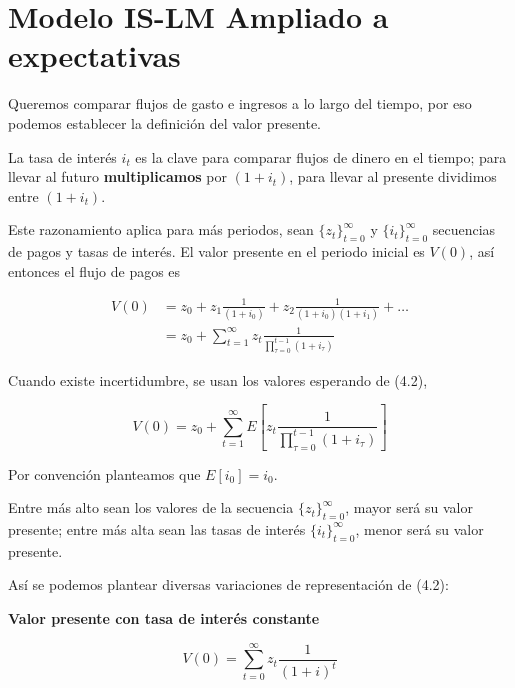 
\section{Modelo IS-LM Ampliado a expectativas}
Queremos comparar flujos de gasto e ingresos a lo largo del tiempo, por eso podemos establecer la definición del valor presente.

La tasa de interés $i_{t}$ es la clave para comparar flujos de dinero en el tiempo; para llevar al futuro \textbf{multiplicamos} por $(1+i_{t})$, para llevar al presente dividimos entre $(1+i_{t})$. 

Este razonamiento aplica para más periodos, sean $\{z_{t}\}^{\infty}_{t=0}$ y $\{i_{t}\}^{\infty}_{t=0}$ secuencias de pagos y tasas de interés. El valor presente en el periodo inicial es $V(0)$, así entonces el flujo de pagos es

\begin{align}
    V(0)&= z_{0}+z_{1}\frac{1}{(1+i_{0})}+z_{2}\frac{1}{(1+i_{0})(1+i_{1})} +\dots \\
    &= z_{0}+\sum_{t=1}^{\infty} z_{t}\frac{1}{\prod_{\tau=0}^{t-1}(1+i_{\tau})}
\end{align}

Cuando existe incertidumbre, se usan los valores esperando de (4.2),

\begin{equation}
    V(0)= z_{0}+\sum_{t=1}^{\infty}E \left[ z_{t}\frac{1}{\prod_{\tau=0}^{t-1}(1+i_{\tau})} \right]
\end{equation}

Por convención planteamos que $E[i_{0}]=i_{0}$.

\begin{remark}
Entre más alto sean los valores de la secuencia $\{z_{t}\}^{\infty}_{t=0}$, mayor será su valor presente; entre más alta sean las tasas de interés $\{i_{t}\}^{\infty}_{t=0}$, menor será su valor presente.
\end{remark}

Así se podemos plantear diversas variaciones de representación de (4.2):

\textbf{Valor presente con tasa de interés constante}

\begin{equation}
    V(0)=\sum_{t=0}^{\infty} z_{t}\frac{1}{(1+i)^{t}}
\end{equation}

